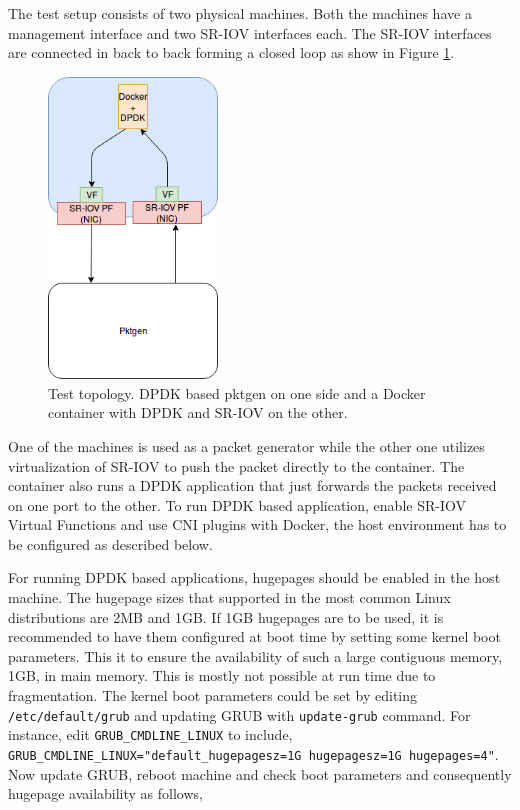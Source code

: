 \documentclass[english, 12pt, a4paper, elec, utf8, a-1b, online]{aaltothesis}
\begin{document}
The test setup consists of two physical machines. Both the machines have a management interface and two SR-IOV interfaces each. The SR-IOV interfaces are connected in back to back forming a closed loop as show in Figure \ref{fig-test-sriov-dpdk}.
\begin{figure}[htb]
\begin{center}
\includegraphics[height=8cm]{pics/ContainerOnDPDKandSRIOV.png}
\end{center}
\caption{Test topology. DPDK based pktgen on one side and a Docker container with DPDK and SR-IOV on the other.}
\label{fig-test-sriov-dpdk}
\end{figure}

One of the machines is used as a packet generator while the other one utilizes virtualization of SR-IOV to push the packet directly to the container. The container also runs a DPDK application that just forwards the packets received on one port to the other. To run DPDK based application, enable SR-IOV Virtual Functions and use CNI plugins with Docker, the host environment has to be configured as described below.

For running DPDK based applications, hugepages should be enabled in the host machine. The hugepage sizes that supported in the most common Linux distributions are 2MB and 1GB. If 1GB hugepages are to be used, it is recommended to have them configured at boot time by setting some kernel boot parameters. This it to ensure the availability of such a large contiguous memory, 1GB, in main memory. This is mostly not possible at run time due to fragmentation. The kernel boot parameters could be set by editing \lstinline{/etc/default/grub} and updating GRUB with \lstinline{update-grub} command. For instance, edit \lstinline{GRUB_CMDLINE_LINUX} to include, \lstinline{GRUB_CMDLINE_LINUX="default_hugepagesz=1G hugepagesz=1G hugepages=4"}. Now update GRUB, reboot machine and check boot parameters and consequently hugepage availability as follows,
\end{document}

